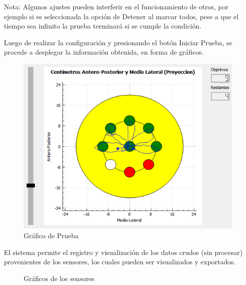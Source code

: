 \documentclass[12pt,a4paper]{article}
\begin{document}
Nota: Algunos ajustes pueden interferir en el funcionamiento de otros, por ejemplo si es seleccionada la opción de Detener al marcar todos, pese a que el tiempo sea infinito la prueba terminará si se cumple la condición.

\newpage
Luego de realizar la configuración y presionando el botón Iniciar Prueba, se procede a desplegar la información obtenida, en forma de gráficos.

\begin{figure}[H]
	\centering
	\includegraphics[scale=0.76]{images/graficoPrincipal}
	\caption{Gráfico de Prueba}
	\label{fig:graficoPrincipal}
\end{figure}

El sistema permite el registro y visualización de los datos crudos (sin procesar) provenientes de los sensores, los cuales pueden ser visualizados y exportados.

\begin{figure}[H]
	\centering
	\caption{Gráficos de los sensores}
	\label{fig:Graficosensores}
\end{figure}
\end{document}
